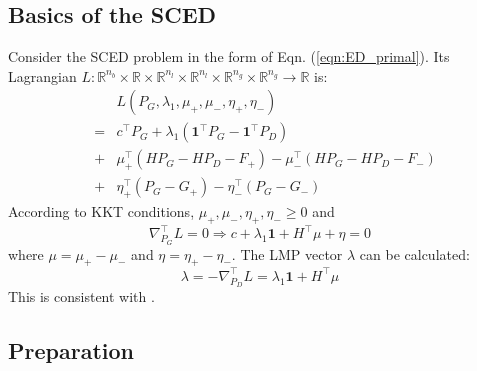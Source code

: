 \documentclass[letterpaper, 11pt]{article}
\theoremstyle{plain}
\theoremstyle{definition}
\begin{document}
\subsection{Basics of the SCED} \label{sub:basics_of_the_sced}
Consider the SCED problem in the form of Eqn. (\ref{eqn:ED_primal}). Its Lagrangian $L: \mathbb{R}^{n_b}\times \mathbb{R} \times \mathbb{R}^{n_l}\times \mathbb{R}^{n_l}\times \mathbb{R}^{n_g}\times \mathbb{R}^{n_g} \rightarrow \mathbb{R}$ is:
\begin{eqnarray}
  & & L(P_G,\lambda_1, \mu_+, \mu_-, \eta_+, \eta_-) \nonumber \\
  &=&  c^\intercal P_G + \lambda_1 (\mathbf{1}^\intercal P_G - \mathbf{1}^\intercal P_D) \nonumber \\
  &+& \mu_+^\intercal (H P_G - H P_D - F_+) - \mu_-^\intercal (H P_G - H P_D - F_-) \nonumber \\
  &+& \eta_+^\intercal (P_G - G_+) - \eta_-^\intercal (P_G - G_-)
\end{eqnarray}
According to KKT conditions, $\mu_+, \mu_-, \eta_+, \eta_- \ge 0$ and 
\begin{equation}
  \nabla_{P_G}^\intercal L = 0 \Rightarrow c + \lambda_1 \mathbf{1} + H^\intercal \mu + \eta = 0 \label{eqn:kkt_nabla_is_0}
\end{equation}
where $\mu = \mu_+ - \mu_-$ and $\eta = \eta_+ - \eta_-$.
The LMP vector $\lambda$ can be calculated:
\begin{equation}
  \lambda = -\nabla_{P_D}^\intercal L = \lambda_1 \mathbf{1} + H^\intercal \mu
\end{equation}
This is consistent with \cite{Wu1996}.



\subsection{Preparation} \label{sub:preparation}
\end{document}
